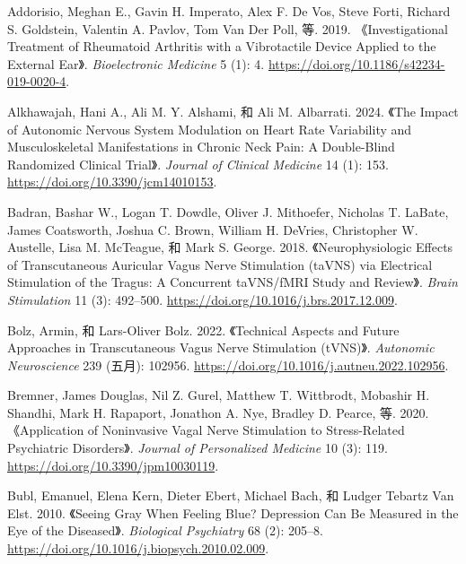 \documentclass[
  Letterpaper,
]{scrbook}
\newlength{\cslhangindent}
\newenvironment{CSLReferences}[2] %
 {\begin{list}{}{%
  \setlength{\itemindent}{0pt}
  \setlength{\leftmargin}{0pt}
  \setlength{\parsep}{0pt}
  \ifodd #1
   \setlength{\leftmargin}{\cslhangindent}
   \setlength{\itemindent}{-1\cslhangindent}
  \fi
  \setlength{\itemsep}{#2\baselineskip}}}
 {\end{list}}
\begin{document}

\label{refs}
\begin{CSLReferences}{1}{0}
Addorisio, Meghan E., Gavin H. Imperato, Alex F. De Vos, Steve Forti,
Richard S. Goldstein, Valentin A. Pavlov, Tom Van Der Poll, 等. 2019.
{《Investigational Treatment of Rheumatoid Arthritis with a Vibrotactile
Device Applied to the External Ear》}. \emph{Bioelectronic Medicine} 5
(1): 4. \url{https://doi.org/10.1186/s42234-019-0020-4}.

Alkhawajah, Hani A., Ali M. Y. Alshami, 和 Ali M. Albarrati. 2024.
{《The {Impact} of {Autonomic Nervous System Modulation} on {Heart Rate
Variability} and {Musculoskeletal Manifestations} in {Chronic Neck
Pain}: {A Double-Blind Randomized Clinical Trial}》}. \emph{Journal of
Clinical Medicine} 14 (1): 153.
\url{https://doi.org/10.3390/jcm14010153}.

Badran, Bashar W., Logan T. Dowdle, Oliver J. Mithoefer, Nicholas T.
LaBate, James Coatsworth, Joshua C. Brown, William H. DeVries,
Christopher W. Austelle, Lisa M. McTeague, 和 Mark S. George. 2018.
{《Neurophysiologic Effects of Transcutaneous Auricular Vagus Nerve
Stimulation ({taVNS}) via Electrical Stimulation of the Tragus: {A}
Concurrent {taVNS}/{fMRI} Study and Review》}. \emph{Brain Stimulation}
11 (3): 492--500. \url{https://doi.org/10.1016/j.brs.2017.12.009}.

Bolz, Armin, 和 Lars-Oliver Bolz. 2022. {《Technical Aspects and Future
Approaches in Transcutaneous Vagus Nerve Stimulation ({tVNS})》}.
\emph{Autonomic Neuroscience} 239 (五月): 102956.
\url{https://doi.org/10.1016/j.autneu.2022.102956}.

Bremner, James Douglas, Nil Z. Gurel, Matthew T. Wittbrodt, Mobashir H.
Shandhi, Mark H. Rapaport, Jonathon A. Nye, Bradley D. Pearce, 等. 2020.
{《Application of {Noninvasive Vagal Nerve Stimulation} to
{Stress-Related Psychiatric Disorders}》}. \emph{Journal of Personalized
Medicine} 10 (3): 119. \url{https://doi.org/10.3390/jpm10030119}.

Bubl, Emanuel, Elena Kern, Dieter Ebert, Michael Bach, 和 Ludger Tebartz
Van Elst. 2010. {《Seeing {Gray When Feeling Blue}? {Depression Can Be
Measured} in the {Eye} of the {Diseased}》}. \emph{Biological
Psychiatry} 68 (2): 205--8.
\url{https://doi.org/10.1016/j.biopsych.2010.02.009}.


\end{CSLReferences}
\end{document}
